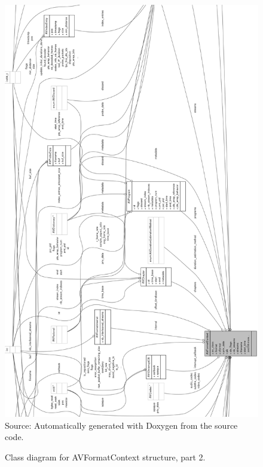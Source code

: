 \documentclass[
	12pt,				%
	openright,			%
	twoside,			%
	a4paper,			%
	brazil,
	french,				%
	english
	]{abntex2}
\begin{document}
\begin{apendicesenv}
\begin{figure}[!hb]
\centering
\caption{Class diagram for AVFormatContext structure, part 2.}
\includegraphics[width=0.9\linewidth]{figuras/structAVFormatContext__coll__graph_2.png}
\\Source: Automatically generated with Doxygen from the source code.
\label{fig:structAVFormatContext__coll__graph_2}
\end{figure}


\end{apendicesenv}
\end{document}
